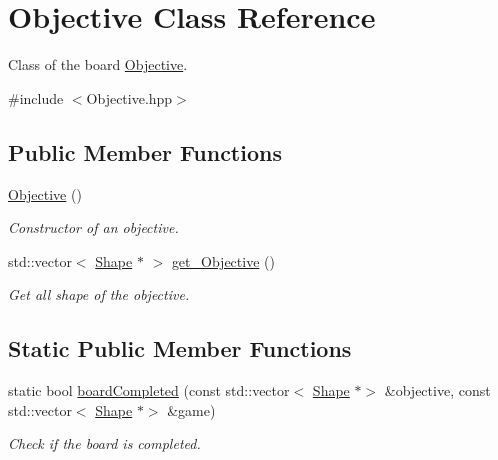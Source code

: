 \hypertarget{classObjective}{}\section{Objective Class Reference}
\label{classObjective}


Class of the board \hyperlink{classObjective}{Objective}.  




{\ttfamily \#include $<$Objective.\+hpp$>$}

\subsection*{Public Member Functions}
\begin{DoxyCompactItemize}
\item 
\mbox{\label{classObjective_aadaa202961d23b2a6b36217104b79993}} 
\hyperlink{classObjective_aadaa202961d23b2a6b36217104b79993}{Objective} ()
\begin{DoxyCompactList}\small\item\em Constructor of an objective. \end{DoxyCompactList}\item 
std\+::vector$<$ \hyperlink{classShape}{Shape} $\ast$ $>$ \hyperlink{classObjective_af8549ee8afd9571567a12dc4ecfddbcc}{get\+\_\+\+Objective} ()
\begin{DoxyCompactList}\small\item\em Get all shape of the objective. \end{DoxyCompactList}\end{DoxyCompactItemize}
\subsection*{Static Public Member Functions}
\begin{DoxyCompactItemize}
\item 
static bool \hyperlink{classObjective_ac7ad4e014ef1d141ab2102958d5ea2f6}{board\+Completed} (const std\+::vector$<$ \hyperlink{classShape}{Shape} $\ast$$>$ \&objective, const std\+::vector$<$ \hyperlink{classShape}{Shape} $\ast$$>$ \&game)
\begin{DoxyCompactList}\small\item\em Check if the board is completed. \end{DoxyCompactList}\end{DoxyCompactItemize}


